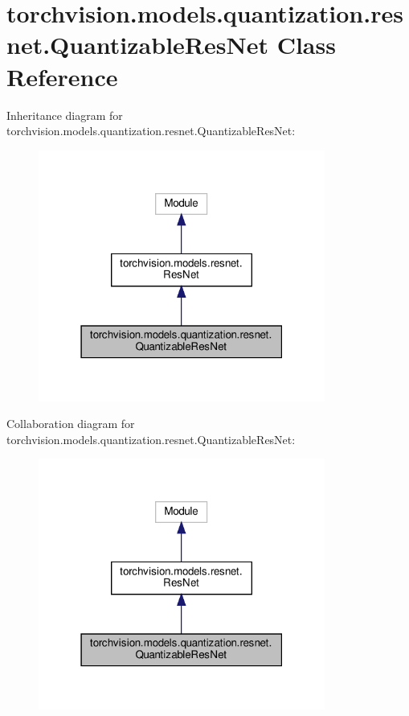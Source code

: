 \hypertarget{classtorchvision_1_1models_1_1quantization_1_1resnet_1_1QuantizableResNet}{}\section{torchvision.\+models.\+quantization.\+resnet.\+Quantizable\+Res\+Net Class Reference}
\label{classtorchvision_1_1models_1_1quantization_1_1resnet_1_1QuantizableResNet}


Inheritance diagram for torchvision.\+models.\+quantization.\+resnet.\+Quantizable\+Res\+Net\+:
\nopagebreak
\begin{figure}[H]
\begin{center}
\leavevmode
\includegraphics[width=267pt]{classtorchvision_1_1models_1_1quantization_1_1resnet_1_1QuantizableResNet__inherit__graph}
\end{center}
\end{figure}


Collaboration diagram for torchvision.\+models.\+quantization.\+resnet.\+Quantizable\+Res\+Net\+:
\nopagebreak
\begin{figure}[H]
\begin{center}
\leavevmode
\includegraphics[width=267pt]{classtorchvision_1_1models_1_1quantization_1_1resnet_1_1QuantizableResNet__coll__graph}
\end{center}
\end{figure}
